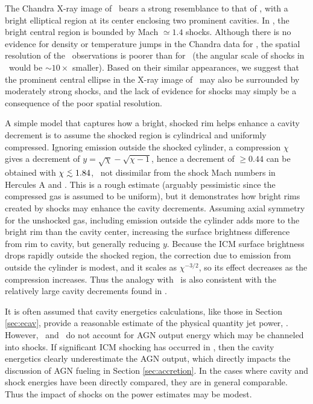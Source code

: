 \documentclass[iop]{emulateapj}
\begin{document}
The Chandra X-ray image of \rbs\ bears a strong resemblance to that of
\ms, with a bright elliptical region at its center enclosing two
prominent cavities. In \ms, the bright central region is bounded by
Mach $\simeq 1.4$ shocks. Although there is no evidence for density or
temperature jumps in the Chandra data for \rbs, the spatial resolution
of the \rbs\ observations is poorer than for \ms\ (the angular scale
of shocks in \rbs\ would be $\sim 10\times$ smaller). Based on their
similar appearances, we suggest that the prominent central ellipse in
the X-ray image of \rbs\ may also be surrounded by moderately strong
shocks, and the lack of evidence for shocks may simply be a
consequence of the poor spatial resolution.

A simple model that captures how a bright, shocked rim helps enhance a
cavity decrement is to assume the shocked region is cylindrical and
uniformly compressed. Ignoring emission outside the shocked cylinder,
a compression $\chi$ gives a decrement of $y = \sqrt{\chi} -
\sqrt{\chi - 1}$, hence a decrement of $\ge 0.44$ can be obtained with
$\chi \la 1.84$, \ie\ not dissimilar from the shock Mach numbers in
Hercules A and \ms. This is a rough estimate (arguably pessimistic
since the compressed gas is assumed to be uniform), but it
demonstrates how bright rims created by shocks may enhance the cavity
decrements. Assuming axial symmetry for the unshocked gas, including
emission outside the cylinder adds more to the bright rim than the
cavity center, increasing the surface brightness difference from rim
to cavity, but generally reducing $y$. Because the ICM surface
brightness drops rapidly outside the shocked region, the correction
due to emission from outside the cylinder is modest, and it scales as
$\chi^{-3/2}$, so its effect decreases as the compression
increases. Thus the analogy with \ms\ is also consistent with the
relatively large cavity decrements found in \rbs.

It is often assumed that cavity energetics calculations, like those in
Section \ref{sec:ecav}, provide a reasonable estimate of the physical
quantity jet power, \pjet. However, \pcav\ and \pjet\ do not account
for AGN output energy which may be channeled into shocks. If
significant ICM shocking has occurred in \rbs, then the cavity
energetics clearly underestimate the AGN output, which directly
impacts the discussion of AGN fueling in Section
\ref{sec:accretion}. In the cases where cavity and shock energies have
been directly compared, they are in general comparable. Thus the
impact of shocks on the power estimates may be modest.
\end{document}
